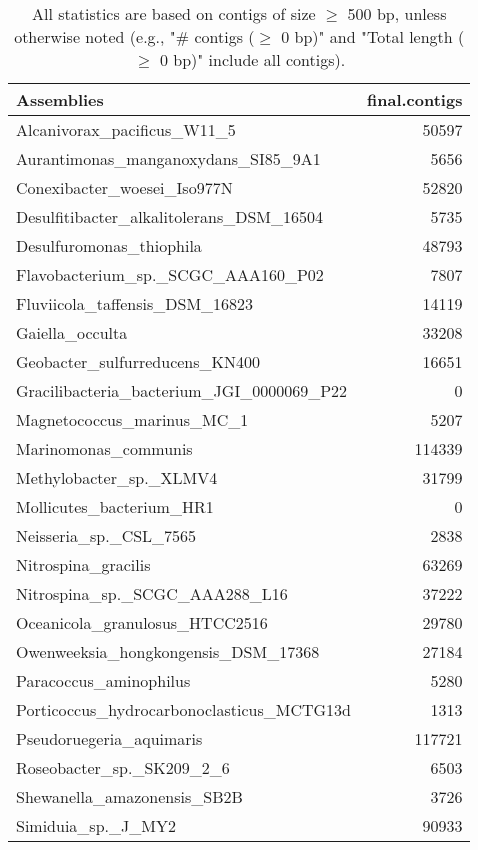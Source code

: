 \documentclass[12pt,a4paper]{article}
\begin{document}
\begin{table}[ht]
\begin{center}
\caption{All statistics are based on contigs of size $\geq$ 500 bp, unless otherwise noted (e.g., "\# contigs ($\geq$ 0 bp)" and "Total length ($\geq$ 0 bp)" include all contigs).}
\begin{tabular}{|l*{1}{|r}|}
\hline
Assemblies & final.contigs \\ \hline
Alcanivorax\_pacificus\_W11\_5 & 50597 \\ \hline
Aurantimonas\_manganoxydans\_SI85\_9A1 & 5656 \\ \hline
Conexibacter\_woesei\_Iso977N & 52820 \\ \hline
Desulfitibacter\_alkalitolerans\_DSM\_16504 & 5735 \\ \hline
Desulfuromonas\_thiophila & 48793 \\ \hline
Flavobacterium\_sp.\_SCGC\_AAA160\_P02 & 7807 \\ \hline
Fluviicola\_taffensis\_DSM\_16823 & 14119 \\ \hline
Gaiella\_occulta & 33208 \\ \hline
Geobacter\_sulfurreducens\_KN400 & 16651 \\ \hline
Gracilibacteria\_bacterium\_JGI\_0000069\_P22 & 0 \\ \hline
Magnetococcus\_marinus\_MC\_1 & 5207 \\ \hline
Marinomonas\_communis & 114339 \\ \hline
Methylobacter\_sp.\_XLMV4 & 31799 \\ \hline
Mollicutes\_bacterium\_HR1 & 0 \\ \hline
Neisseria\_sp.\_CSL\_7565 & 2838 \\ \hline
Nitrospina\_gracilis & 63269 \\ \hline
Nitrospina\_sp.\_SCGC\_AAA288\_L16 & 37222 \\ \hline
Oceanicola\_granulosus\_HTCC2516 & 29780 \\ \hline
Owenweeksia\_hongkongensis\_DSM\_17368 & 27184 \\ \hline
Paracoccus\_aminophilus & 5280 \\ \hline
Porticoccus\_hydrocarbonoclasticus\_MCTG13d & 1313 \\ \hline
Pseudoruegeria\_aquimaris & 117721 \\ \hline
Roseobacter\_sp.\_SK209\_2\_6 & 6503 \\ \hline
Shewanella\_amazonensis\_SB2B & 3726 \\ \hline
Simiduia\_sp.\_J\_MY2 & 90933 \\ \hline

\end{tabular}
\end{center}
\end{table}
\end{document}
